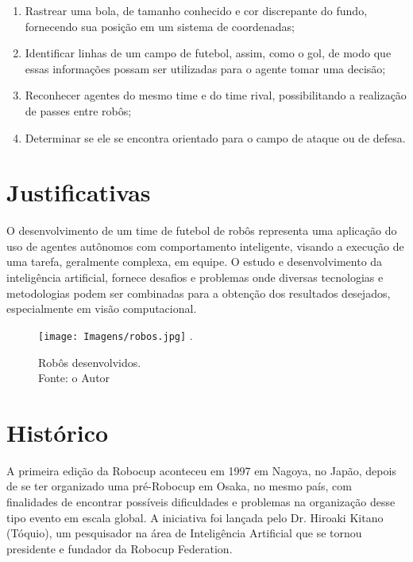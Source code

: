 \begin{enumerate}
	\item Rastrear uma bola, de tamanho conhecido e cor discrepante do fundo, fornecendo sua posição em um sistema de coordenadas;
	\item Identificar linhas de um campo de futebol, assim, como o gol, de modo que essas informações possam ser utilizadas para o agente tomar uma decisão;
	\item Reconhecer agentes do mesmo time e do time rival, possibilitando a realização de passes entre robôs;
	\item Determinar se ele se encontra orientado para o campo de ataque ou de defesa.

\end{enumerate}

\section{Justificativas}
O desenvolvimento de um time de futebol de robôs representa uma aplicação do uso de agentes autônomos com comportamento inteligente, visando a execução de uma tarefa, geralmente complexa, em equipe. O estudo e desenvolvimento da inteligência artificial, fornece desafios e problemas onde diversas tecnologias e metodologias podem ser combinadas para a obtenção dos resultados desejados, especialmente em visão computacional.

\begin{figure}[!t1]
\centering
\texttt{[image: Imagens/robos.jpg]}
\DeclareGraphicsExtensions.
\caption{Robôs desenvolvidos.\\ Fonte: o Autor}
\label{Fig:Robos}
\end{figure}

\section{Histórico}

A primeira edição da Robocup aconteceu em 1997 em Nagoya, no Japão, depois de se ter organizado uma pré-Robocup em Osaka, no mesmo país, com finalidades de encontrar possíveis dificuldades e problemas na organização desse tipo evento em escala global. A iniciativa foi lançada pelo Dr. Hiroaki Kitano (Tóquio), um pesquisador na área de Inteligência Artificial que se tornou presidente e fundador da Robocup Federation.



